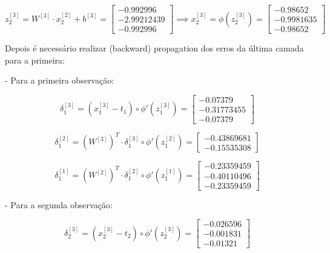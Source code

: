 \documentclass[a4paper,12pt]{article} %
\begin{document}
\begin{enumerate}
\begin{equation*}
    z^{[3]}_2 = W^{[3]} \cdot x^{[2]}_2 + b^{[3]} = \begin{bmatrix} -0.992996 \\ -2.99212439 \\ -0.992996 \end{bmatrix} \implies x^{[3]}_2 = \phi(z^{[3]}_2)= \begin{bmatrix} -0.98652 \\ -0.9981635\\ -0.98652 \end{bmatrix}
\end{equation*}

Depois é necessário realizar (backward) propagation dos erros da última camada para a primeira:

- Para a primeira observação:

\begin{equation*}
    \delta^{[3]}_1 = (x^{[3]}_1 - t_1) \circ \phi'(z^{[3]}_1) = \begin{bmatrix} -0.07379 \\ -0.31773455 \\ -0.07379 \end{bmatrix}
\end{equation*}

\begin{equation*}
    \delta^{[2]}_1 = (W^{[3]})^T \cdot \delta^{[3]}_1 \circ \phi'(z^{[2]}_1) = \begin{bmatrix} -0.43869681\\ -0.15535308 \end{bmatrix}
\end{equation*}

\begin{equation*}
    \delta^{[1]}_1 = (W^{[2]})^T \cdot \delta^{[2]}_1 \circ \phi'(z^{[1]}_1) = \begin{bmatrix} -0.23359459 \\ -0.40110496 \\ -0.23359459 \end{bmatrix}
\end{equation*}

- Para a segunda observação:

\begin{equation*}
    \delta^{[3]}_2 = (x^{[3]}_2 - t_2) \circ \phi'(z^{[3]}_2) = \begin{bmatrix} -0.026596 \\ -0.001831 \\ -0.01321 \end{bmatrix}
\end{equation*}


\end{enumerate}
\end{document}
